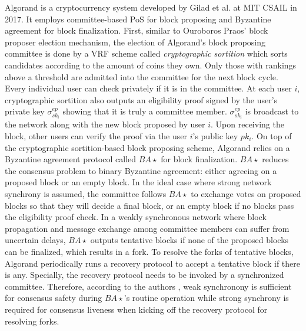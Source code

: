 Algorand is a cryptocurrency system developed by Gilad et al.  at MIT CSAIL in 2017. It employs committee-based PoS for block proposing and Byzantine agreement for block finalization.
{\color{\rcolor}
First, similar to Ouroboros Praos' block proposer election mechanism, the election of Algorand's block proposing committee is done by a VRF scheme called \emph{cryptographic sortition} which sorts candidates according to the amount of coins they own. 
}
Only those with rankings above a threshold are admitted into the committee for the next block cycle. Every individual user can check privately if it is in the committee. At each user $i$, cryptographic sortition also outputs an eligibility proof signed by the user's private key $\sigma_{sk_i}^{ep}$ showing that it is truly a committee member. $\sigma_{sk_i}^{ep}$ is broadcast to the network along with the new block proposed by user $i$. Upon receiving the block, other users can verify the proof via the user $i$'s public key $pk_i$.
On top of the cryptographic sortition-based block proposing scheme, Algorand relies on a Byzantine agreement protocol called $BA\star$ for block finalization. $BA\star$ reduces the consensus problem to binary Byzantine agreement: either agreeing on a proposed block or an empty block. In the ideal case where strong network synchrony is assumed, the committee follows $BA\star$ to exchange votes on proposed blocks so that they will decide a final block, or an empty block if no blocks pass the eligibility proof check. In a weakly synchronous network where block propagation and message exchange among committee members can suffer from uncertain delays, $BA\star$ outputs tentative blocks if none of the proposed blocks can be finalized, which results in a fork. To resolve the forks of tentative blocks, Algorand periodically runs a recovery protocol to accept a tentative block if there is any. Specially, the recovery protocol needs to be invoked by a synchronized committee. Therefore, according to the authors , weak synchronony is sufficient for consensus safety during $BA\star$'s routine operation while strong synchrony is required for consensus liveness when kicking off the recovery protocol for resolving forks.
